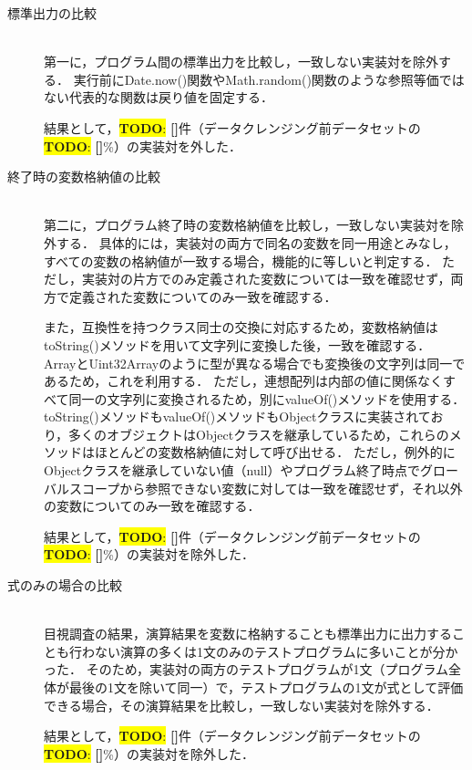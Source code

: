 \documentclass[11pt]{jreport}
\newcommand{\todo}[1]{\colorbox{yellow}{{\bf TODO}:}{\color{red} {\textbf{[#1]}}}}
\begin{document}
\begin{description}

\item[標準出力の比較]\mbox{}\\
第一に，プログラム間の標準出力を比較し，一致しない実装対を除外する．
実行前にDate.now()関数やMath.random()関数のような参照等価ではない代表的な関数は戻り値を固定する．

結果として，\todo{}件（データクレンジング前データセットの\todo{}\%）の実装対を外した．

\item[終了時の変数格納値の比較]\mbox{}\\
第二に，プログラム終了時の変数格納値を比較し，一致しない実装対を除外する．
具体的には，実装対の両方で同名の変数を同一用途とみなし，すべての変数の格納値が一致する場合，機能的に等しいと判定する．
ただし，実装対の片方でのみ定義された変数については一致を確認せず，両方で定義された変数についてのみ一致を確認する．

また，互換性を持つクラス同士の交換に対応するため，変数格納値はtoString()メソッドを用いて文字列に変換した後，一致を確認する．
ArrayとUint32Arrayのように型が異なる場合でも変換後の文字列は同一であるため，これを利用する．
ただし，連想配列は内部の値に関係なくすべて同一の文字列に変換されるため，別にvalueOf()メソッドを使用する．
toString()メソッドもvalueOf()メソッドもObjectクラスに実装されており，多くのオブジェクトはObjectクラスを継承しているため，これらのメソッドはほとんどの変数格納値に対して呼び出せる．
ただし，例外的にObjectクラスを継承していない値（null）やプログラム終了時点でグローバルスコープから参照できない変数に対しては一致を確認せず，それ以外の変数についてのみ一致を確認する．

結果として，\todo{}件（データクレンジング前データセットの\todo{}\%）の実装対を除外した．

\item[式のみの場合の比較]\mbox{}\\
目視調査の結果，演算結果を変数に格納することも標準出力に出力することも行わない演算の多くは1文のみのテストプログラムに多いことが分かった．
そのため，実装対の両方のテストプログラムが1文（プログラム全体が最後の1文を除いて同一）で，テストプログラムの1文が式として評価できる場合，その演算結果を比較し，一致しない実装対を除外する．

結果として，\todo{}件（データクレンジング前データセットの\todo{}\%）の実装対を除外した．

\end{description}


\end{document}
